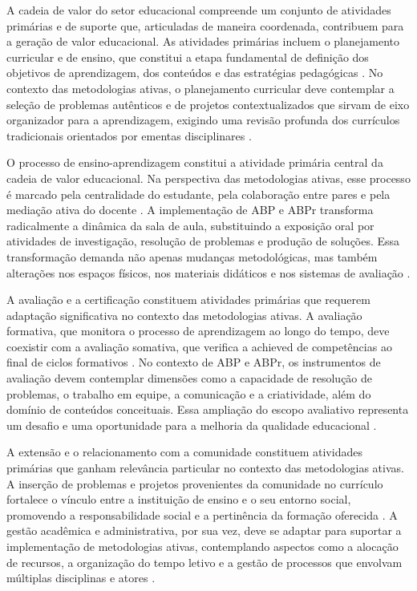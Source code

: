 A cadeia de valor do setor educacional compreende um conjunto de atividades primárias e de suporte que, articuladas de maneira coordenada, contribuem para a geração de valor educacional. As atividades primárias incluem o planejamento curricular e de ensino, que constitui a etapa fundamental de definição dos objetivos de aprendizagem, dos conteúdos e das estratégias pedagógicas \cite{BRASIL2018}. No contexto das metodologias ativas, o planejamento curricular deve contemplar a seleção de problemas autênticos e de projetos contextualizados que sirvam de eixo organizador para a aprendizagem, exigindo uma revisão profunda dos currículos tradicionais orientados por ementas disciplinares \cite{COSTA2020}.

O processo de ensino-aprendizagem constitui a atividade primária central da cadeia de valor educacional. Na perspectiva das metodologias ativas, esse processo é marcado pela centralidade do estudante, pela colaboração entre pares e pela mediação ativa do docente \cite{MORAN2018}. A implementação de ABP e ABPr transforma radicalmente a dinâmica da sala de aula, substituindo a exposição oral por atividades de investigação, resolução de problemas e produção de soluções. Essa transformação demanda não apenas mudanças metodológicas, mas também alterações nos espaços físicos, nos materiais didáticos e nos sistemas de avaliação \cite{BACICH2018}.

A avaliação e a certificação constituem atividades primárias que requerem adaptação significativa no contexto das metodologias ativas. A avaliação formativa, que monitora o processo de aprendizagem ao longo do tempo, deve coexistir com a avaliação somativa, que verifica a achieved de competências ao final de ciclos formativos \cite{BLACK1998}. No contexto de ABP e ABPr, os instrumentos de avaliação devem contemplar dimensões como a capacidade de resolução de problemas, o trabalho em equipe, a comunicação e a criatividade, além do domínio de conteúdos conceituais. Essa ampliação do escopo avaliativo representa um desafio e uma oportunidade para a melhoria da qualidade educacional \cite{SOARES2016}.

A extensão e o relacionamento com a comunidade constituem atividades primárias que ganham relevância particular no contexto das metodologias ativas. A inserção de problemas e projetos provenientes da comunidade no currículo fortalece o vínculo entre a instituição de ensino e o seu entorno social, promovendo a responsabilidade social e a pertinência da formação oferecida \cite{BARRON1998}. A gestão acadêmica e administrativa, por sua vez, deve se adaptar para suportar a implementação de metodologias ativas, contemplando aspectos como a alocação de recursos, a organização do tempo letivo e a gestão de processos que envolvam múltiplas disciplinas e atores \cite{OLIVEIRA2023}.

